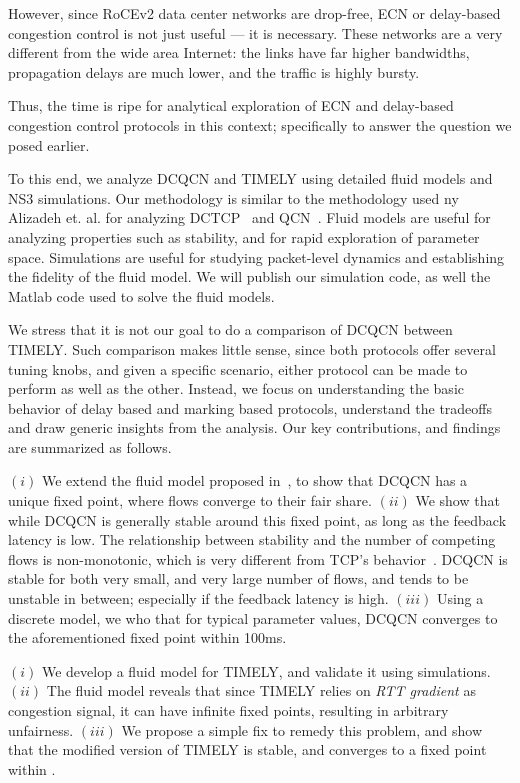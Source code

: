 However, since RoCEv2 data center networks are drop-free, ECN or
delay-based congestion control is not just useful --- it is necessary. These
networks are a very different from the wide area Internet: the links have far
higher bandwidths, propagation delays are much lower, and the traffic is highly
bursty.  

Thus, the time is ripe for analytical exploration of ECN and delay-based
congestion control protocols in this context; specifically to answer the
question we posed earlier.


To this end, we analyze DCQCN and TIMELY using detailed fluid models and NS3
simulations. Our methodology is similar to the methodology used ny Alizadeh et.
al. for analyzing DCTCP~\cite{dctcp-analysis} and QCN~\cite{qcn-analysis}. Fluid
models are useful for analyzing properties such as stability, and for rapid
exploration of parameter space.  Simulations are useful for studying
packet-level dynamics and establishing the fidelity of the fluid model.  We will
publish our simulation code, as well the Matlab code used to solve the fluid
models.


We stress that it is not our goal to do a comparison of DCQCN between
TIMELY.  Such comparison makes little sense, since both protocols offer several
tuning knobs, and given a specific scenario, either protocol can be made to
perform as well as the other. Instead, we focus on understanding the basic
behavior of delay based and marking based protocols, understand the
tradeoffs and draw generic insights from the analysis.
Our key contributions, and findings are summarized as follows.

 $(i)$ We extend the fluid model proposed in~\cite{dcqcn}, to
show that DCQCN has a unique fixed point, where flows converge to their fair
share. $(ii)$ We show that while DCQCN is generally stable around this
fixed point, as long as the feedback latency is low. The relationship between
stability and the number of competing flows is non-monotonic, which is very
different from TCP's behavior~\cite{misra:TAC2002}. DCQCN is stable for both
very small, and very large number of flows, and tends to be unstable in between;
especially if the feedback latency is high.  $(iii)$ Using a discrete model, we
who that for typical parameter values, DCQCN converges to the aforementioned
fixed point within 100ms.

 $(i)$ We develop a fluid model for TIMELY, and validate it using
simulations. $(ii)$ The fluid model reveals that since TIMELY relies on {\em RTT
gradient} as congestion signal, it can have infinite fixed points, resulting in
arbitrary unfairness.  $(iii)$ We propose a simple fix to remedy this problem,
and show that the modified version of TIMELY is stable, and converges to a fixed
point within . 

